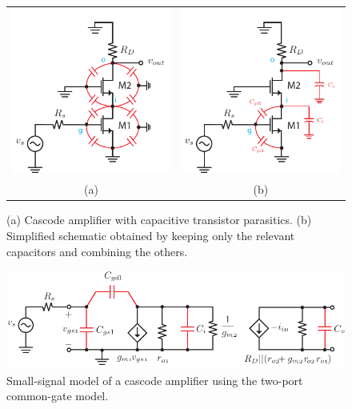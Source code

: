 \begin{figure}[H]
\centering
\begin{tabular}{cc}
\includegraphics[scale=0.85]{12cascode_caps} &
\includegraphics[scale=0.85]{13cascode_caps_simple}\\
(a) & (b)\\
\end{tabular}
\caption{(a) Cascode amplifier with capacitive transistor parasitics.  (b) Simplified schematic obtained by keeping only the relevant capacitors and combining the others.}
\label{fig:12cascode_caps}
\end{figure}
\newpage
\begin{figure}[t]
\centering
\includegraphics[scale=1.15]{14cascode_ac_ss}
\caption{Small-signal model of a cascode amplifier using the two-port common-gate model.} \label{fig:14cascode_ac_ss}
\end{figure}
